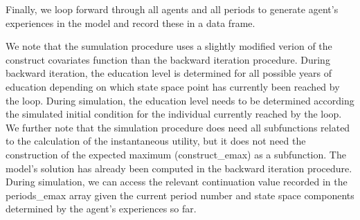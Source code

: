 \documentclass[letterpaper,10pt,english]{sphinxmanual}
\begin{document}
Finally, we loop forward through all agents and all periods to generate agent’s experiences in the model and record these in a data frame.

We note that the sumulation procedure uses a slightly modified verion of the construct covariates function than the backward iteration procedure. During backward iteration, the education level is determined for all possible years of education depending on which state space point has currently been reached by the loop. During simulation, the education level needs to be determined according the simulated initial condition for the individual currently reached by the loop. We further note that the simulation procedure does need all subfunctions related to the calculation of the instantaneous utility, but it does not need the construction of the expected maximum (construct\_emax) as a subfunction. The model’s solution has already been computed in the backward iteration procedure. During simulation, we can access the relevant continuation value recorded in the periods\_emax array given the current period number and state space components determined by the agent’s experiences so far.



\renewcommand{\indexname}{Index}
\printindex
\end{document}
